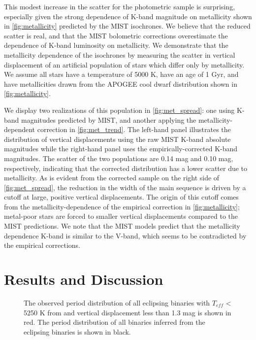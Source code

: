 \documentclass[manuscript]{aastex6}
\newcommand{\Teff}{\ensuremath{T_{eff}}}
\begin{document}
This modest increase in the scatter for the photometric sample is surprising,
especially given the strong dependence of K-band magnitude on metallicity shown
in \cref{fig:metallicity} predicted by the MIST isochrones. We believe that the
reduced scatter is real, and that the MIST bolometric corrections overestimate 
the dependence of K-band luminosity on metallicity. We demonstrate that the
metallicity dependence of the isochrones by measuring the scatter in vertical
displacement of an artificial population of stars which differ only by 
metallicity. We assume all stars have a temperature of 5000 K, have an age
of 1 Gyr, and have metallicities drawn from the APOGEE cool dwarf distribution
shown in \cref{fig:metallicity}.

We display two realizations of this population in \cref{fig:met_spread}: one
using K-band magnitudes predicted by MIST, and another applying the
metallicity-dependent correction in \cref{fig:met_trend}.
The left-hand panel illustrates the distribution of vertical displacements 
using the raw MIST K-band absolute magnitudes while the right-hand panel
uses the empirically-corrected K-band magnitudes. The scatter of the two
populations are 0.14 mag and 0.10 mag, respectively, indicating that the
corrected distribution has a lower scatter due to metallicity.
As is evident from the corrected sample on the right side of 
\cref{fig:met_spread}, the reduction in the width of the main 
sequence is driven by a cutoff at large, positive vertical displacements.
The origin of this cutoff comes from the metallicity-dependence of the empirical 
correction in \cref{fig:metallicity}; metal-poor stars are forced to smaller 
vertical displacements compared to the MIST predictions. We note that the MIST 
models predict that the metallicity dependence K-band is similar to the V-band,
which seems to be contradicted by the empirical corrections.

\section{Results and Discussion}
\label{sec:results}

\begin{figure}[htb]
    \centering
    \caption{The observed period distribution of all eclipsing binaries with
    \Teff{} < 5250 K from \citet{Pinsonneault12} and vertical displacement less
than 1.3 mag is shown in red. The period distribution of all binaries inferred
from the eclipsing binaries is shown in black.}
    \label{fig:ebdist}
\end{figure}
\end{document}
